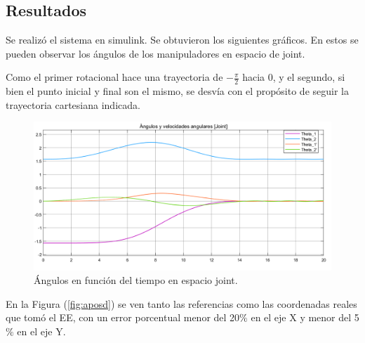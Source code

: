 
\subsection{Resultados}
Se realizó el sistema en simulink. Se obtuvieron los siguientes gráficos.
En estos se pueden observar los ángulos de los manipuladores en espacio de joint.

Como el primer rotacional hace una trayectoria de $-\frac{\pi}{2}$ hacia $0$, y el segundo, si bien el punto inicial y final son el mismo, se desvía con el propósito de seguir la trayectoria cartesiana indicada.

\begin{figure}[H]
	\centering
	\includegraphics[width=0.8\linewidth]{ImagenesControl de posición no lineal/1_3_a}
	\caption{Ángulos en función del tiempo en espacio joint.}	
	\label{fig:athetas}
\end{figure}

En la Figura (\ref{fig:aposd}) se ven tanto las referencias como las coordenadas reales que tomó el EE, con un error porcentual menor del 20$\%$ en el eje X y menor del 5$\%$ en el eje Y. 


